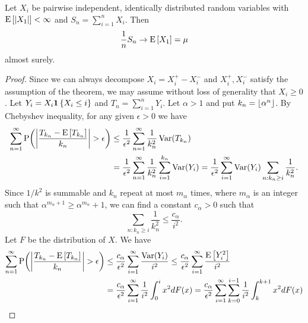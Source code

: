 \begin{theorem}
    Let $X_i$ be pairwise independent, identically distributed 
    random variables with $\operatorname{E}\left[ {\left\lvert {X_1} \right\rvert} \right]<\infty$ and 
    $S_n = \sum_{i=1}^nX_i$. Then 
    \begin{equation*}
        \frac{1}{n}S_n \to \operatorname{E}\left[ {X_1} \right] = \mu
    \end{equation*}
    almost surely. 
\end{theorem}
\begin{proof}
    Since we can always decompose $X_i = X_i^+ - X_i^-$ and 
    $X_i^+, X_i^-$ satisfy the assumption of the theorem, 
    we may assume without loss of generality that $X_i\geq 0$. 
    Let $Y_i = X_i\mathbf{1}\left\{ {X_i\leq i} \right\}$ and $T_n = \sum_{i=1}^nY_i$. 
    Let $\alpha > 1$ and put $k_n = \floor{\alpha^n}$. 
    By Chebyshev inequality, for any given $\epsilon>0$ we have 
    \begin{equation*}
        \begin{split}
            \sum_{n=1}^\infty \P\pth{\abs{\frac{T_{k_n} - \E\sbrc{T_{k_n}}}{k_n}}>\epsilon} 
            &\leq \frac{1}{\epsilon^2}\sum_{n=1}^\infty \frac{1}{k_n^2}\Var(T_{k_n}) \\
            &= \frac{1}{\epsilon^2}\sum_{n=1}^{\infty}\frac{1}{k_n^2}\sum_{i=1}^{k_n}\Var(Y_i) 
            = \frac{1}{\epsilon^2}\sum_{i=1}^\infty\Var(Y_i)\sum_{n:k_n\geq i}\frac{1}{k_n^2}. 
        \end{split}
    \end{equation*}
    Since $1/k^2$ is summable and $k_n$ repeat at most $m_\alpha$ times, where 
    $m_\alpha$ is an integer such that $\alpha^{m_\alpha+1}\geq \alpha^{m_\alpha} + 1$, 
    we can find a constant $c_\alpha>0$ such that 
    \begin{equation*}
        \sum_{n:k_n\geq i}\frac{1}{k_n^2}\leq \frac{c_\alpha}{i^2}. 
    \end{equation*} 
    Let $F$ be the distribution of $X$. We have 
    \begin{equation*}
        \begin{split}
            \sum_{n=1}^\infty \P\pth{\abs{\frac{T_{k_n} - \E\sbrc{T_{k_n}}}{k_n}}>\epsilon} 
            &\leq \frac{c_\alpha}{\epsilon^2}\sum_{i=1}^\infty\frac{\Var(Y_i)}{i^2} 
            \leq \frac{c_\alpha}{\epsilon^2}\sum_{i=1}^\infty\frac{\E\sbrc{Y_i^2}}{i^2} \\ 
            &= \frac{c_\alpha}{\epsilon^2}\sum_{i=1}^\infty\frac{1}{i^2}\int_0^ix^2dF(x) 
            = \frac{c_\alpha}{\epsilon^2}\sum_{i=1}^\infty\sum_{k=0}^{i-1}\frac{1}{i^2}\int_k^{k+1}x^2dF(x) \\ 

\end{split}
\end{equation*}
\end{proof}
